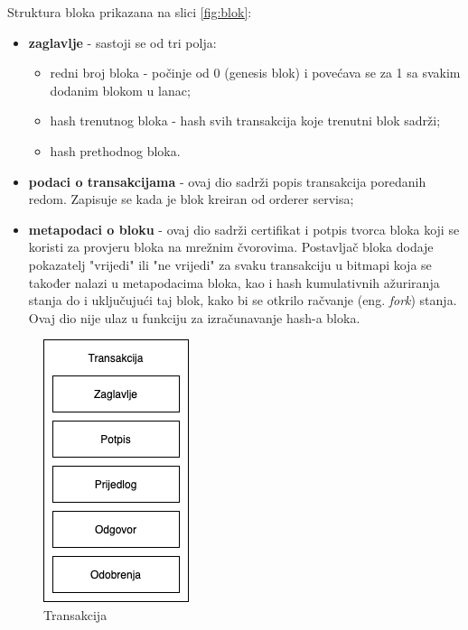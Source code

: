 \documentclass[times, utf8, diplomski]{fer}
\begin{document}
Struktura bloka prikazana na slici \ref{fig:blok}:
\begin{itemize}
\item \textbf{zaglavlje} - sastoji se od tri polja:
	\begin{itemize}
		\item redni broj bloka - počinje od 0 (genesis blok) i povećava se za 1 sa svakim dodanim blokom u lanac;
		\item hash trenutnog bloka - hash svih transakcija koje trenutni blok sadrži;
		\item hash prethodnog bloka.
	\end{itemize}

\item \textbf{podaci o transakcijama} - ovaj dio sadrži popis transakcija poredanih redom. Zapisuje se kada je blok kreiran od orderer servisa;
\item \textbf{metapodaci o bloku} - ovaj dio sadrži certifikat i potpis tvorca bloka koji se koristi za provjeru bloka na mrežnim čvorovima.  Postavljač bloka dodaje pokazatelj "vrijedi" ili "ne vrijedi" za svaku transakciju u bitmapi koja se također nalazi u metapodacima bloka,  kao i hash kumulativnih ažuriranja stanja do i uključujući taj blok,  kako bi se otkrilo račvanje (eng. \textit{fork}) stanja.  Ovaj dio nije ulaz u funkciju za izračunavanje hash-a bloka.
\end{itemize}

\begin{figure}[htb]
\centering
\includegraphics[scale=0.5]{imgs/Transakcija.png}
\caption{Transakcija}
\label{fig:transakcija}
\end{figure}
\end{document}
